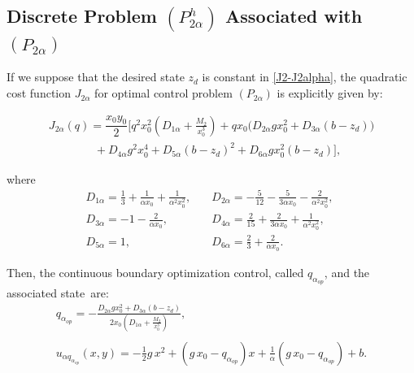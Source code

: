 \documentclass[axioms,article,submit,moreauthors]{Definitions/mdpi}
\begin{document}
 \subsection{Discrete Problem  ${(P^h_{2\alpha})}$ Associated with $(P_{2\alpha})$} 
     
    If we suppose that the desired state $z_d$ is  constant in \eqref{J2-J2alpha}, the quadratic cost function  $J_{2\alpha}$ for optimal control problem $(P_{2\alpha})$ is explicitly given by:
 
      \begin{equation}\label{J2alpha-Explicito}
      \begin{array}{ll}
  J_{2\alpha}(q)=\dfrac{x_0 y_0}{2}\Big[ q^2 x_0^2 (D_{1\alpha} +\tfrac{M_2}{x_0^3})+q x_0 \Big(D_{2\alpha} g x_0^2+D_{3\alpha}  (b-z_d) \Big)\\[0.45cm]
   \qquad \qquad +D_{4\alpha} g^2 x_0^4 +D_{5\alpha}  (b-z_d)^2+D_{6\alpha} g x_0^2 (b-z_d) \Big],
  \end{array}
  \end{equation}
  
 \noindent where
\begin{equation}  
  \begin{array}{lll}
  D_{1\alpha}= \tfrac{1}{3}+\tfrac{1}{\alpha x_0}+\tfrac{1}{\alpha^2 x_0^2} ,  \quad & D_{2\alpha}= -\tfrac{5}{12}-\tfrac{5}{3\alpha x_0}-\tfrac{2}{\alpha^2 x_0^2}, \;\\
   D_{3\alpha}=- 1-\tfrac{2}{\alpha x_0},& D_{4\alpha}=\tfrac{2}{15} +\tfrac{2}{3\alpha x_0}+\tfrac{1}{\alpha^2 x_0^2} ,\\
    D_{5\alpha}=1,   & D_{6\alpha}=\tfrac{2}{3}+\tfrac{2}{\alpha x_0} .
  \end{array}
  \end{equation}
 
  
 \noindent Then, the continuous boundary optimization control, called $q_{\alpha_{op}}$,  and the associated state~are: 
\begin{equation} \label{qalphaop}
\begin{array}{ll}
q_{\alpha_{op}}=-\tfrac{D_{2\alpha} g x_0^2+D_{3\alpha} (b-z_d)}{2 x_0 \left(D_{1\alpha}+\tfrac{M_2}{x_0^3}\right)},\\ \\
 u_{\alpha q_{\alpha_{op}}}(x,y) = -\tfrac{1}{2} g\, x^2 + (g\, x_0 - q_{\alpha_{op}}) x + \tfrac{1}{\alpha} (g\,x_0 - q_{\alpha_{op}}) +b .
 \end{array}
 \end{equation} 
 
\end{document}
